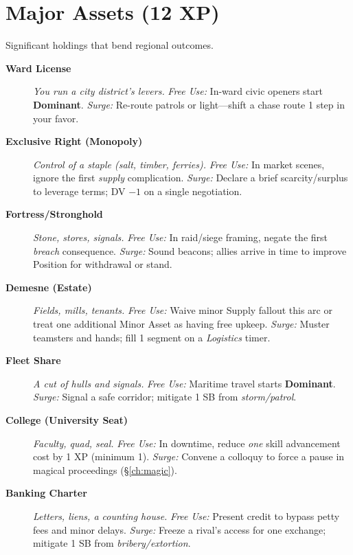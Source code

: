 \section{Major Assets (12 XP)}
Significant holdings that bend regional outcomes.
\begin{description}
  \item[\textbf{Ward License}]  \emph{You run a city district's levers.} \emph{Free Use:} In-ward civic openers start \textbf{Dominant}. \emph{Surge:} Re-route patrols or light---shift a chase route 1 step in your favor.

  \item[\textbf{Exclusive Right (Monopoly)}]  \emph{Control of a staple (salt, timber, ferries).} \emph{Free Use:} In market scenes, ignore the first \emph{supply} complication. \emph{Surge:} Declare a brief scarcity/surplus to leverage terms; DV $-1$ on a single negotiation.

  \item[\textbf{Fortress/Stronghold}]  \emph{Stone, stores, signals.} \emph{Free Use:} In raid/siege framing, negate the first \emph{breach} consequence. \emph{Surge:} Sound beacons; allies arrive in time to improve Position for withdrawal or stand.

  \item[\textbf{Demesne (Estate)}]  \emph{Fields, mills, tenants.} \emph{Free Use:} Waive minor Supply fallout this arc or treat one additional Minor Asset as having free upkeep. \emph{Surge:} Muster teamsters and hands; fill 1 segment on a \emph{Logistics} timer.

  \item[\textbf{Fleet Share}]  \emph{A cut of hulls and signals.} \emph{Free Use:} Maritime travel starts \textbf{Dominant}. \emph{Surge:} Signal a safe corridor; mitigate 1 SB from \emph{storm/patrol}.

  \item[\textbf{College (University Seat)}]  \emph{Faculty, quad, seal.} \emph{Free Use:} In downtime, reduce \emph{one} skill advancement cost by 1 XP (minimum 1). \emph{Surge:} Convene a colloquy to force a pause in magical proceedings (\S\ref{ch:magic}).

  \item[\textbf{Banking Charter}]  \emph{Letters, liens, a counting house.} \emph{Free Use:} Present credit to bypass petty fees and minor delays. \emph{Surge:} Freeze a rival's access for one exchange; mitigate 1 SB from \emph{bribery/extortion}.


\end{description}
